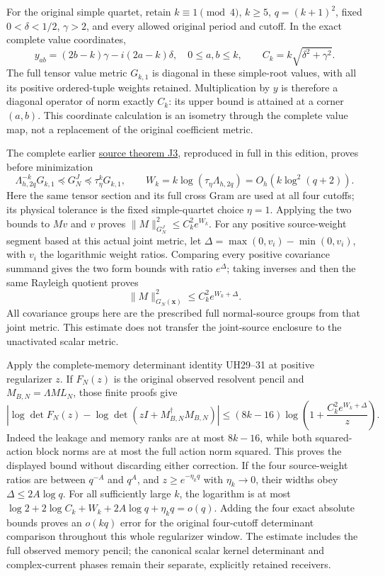 \documentclass[11pt]{article}
\begin{document}
For the original simple quartet, retain \(k\equiv1\pmod4\), \(k\ge5\), \(q=(k+1)^2\), fixed \(0<\delta<1/2\), \(\gamma>2\), and every allowed original period and cutoff. In the exact complete value coordinates, \[
y_{ab}=(2b-k)\gamma-i(2a-k)\delta,\quad 0\le a,b\le k,
\qquad C_k=k\sqrt{\delta^2+\gamma^2}.                     \tag{UFR21}
\] The full tensor value metric \(G_{k,1}\) is diagonal in these simple-root values, with all its positive ordered-tuple weights retained. Multiplication by \(y\) is therefore a diagonal operator of norm exactly \(C_k\): its upper bound is attained at a corner \((a,b)\). This coordinate calculation is an isometry through the complete value map, not a replacement of the original coefficient metric.

The complete earlier \href{https://github.com/KokunoYumeto/zeta-function-research-reader/blob/main/workbenches/splitzero-tandem/continuations/20260921-uniform-source-family/JOINT_MINIMUM_COMPLETE.tex\#L634}{source theorem J3}, reproduced in full in this edition, proves before minimization \[
\Lambda_{h,2q}^{-k}G_{k,1}\preceq G_N^J
\preceq\tau_\eta^kG_{k,1},\qquad
W_k=k\log(\tau_\eta\Lambda_{h,2q})=O_h(k\log^2(q+2)).
\] Here the same tensor section and its full cross Gram are used at all four cutoffs; its physical tolerance is the fixed simple-quartet choice \(\eta=1\). Applying the two bounds to \(Mv\) and \(v\) proves \(\|M\|_{G_N^J}^2\le C_k^2 e^{W_k}\). For any positive source-weight segment based at this actual joint metric, let \(\Delta=\max(0,v_i)-\min(0,v_i)\), with \(v_i\) the logarithmic weight ratios. Comparing every positive covariance summand gives the two form bounds with ratio \(e^\Delta\); taking inverses and then the same Rayleigh quotient proves \[
\|M\|_{G_N(\mathbf x)}^2\le C_k^2e^{W_k+\Delta}.
                                                               \tag{UFR22}
\] All covariance groups here are the prescribed full normal-source groups from that joint metric. This estimate does not transfer the joint-source enclosure to the unactivated scalar metric.

Apply the complete-memory determinant identity UH29--31 at positive regularizer \(z\). If \(F_N(z)\) is the original observed resolvent pencil and \(M_{B,N}=\Lambda ML_N\), those finite proofs give \[
\left|\log\det F_N(z)-\log\det(zI+M_{B,N}^{\dagger}M_{B,N})\right|
\le (8k-16)\log\left(1+\frac{C_k^2e^{W_k+\Delta}}{z}\right).
                                                               \tag{UFR23}
\] Indeed the leakage and memory ranks are at most \(8k-16\), while both squared-action block norms are at most the full action norm squared. This proves the displayed bound without discarding either correction. If the four source-weight ratios are between \(q^{-A}\) and \(q^A\), and \(z\ge e^{-\eta_k q}\) with \(\eta_k\to0\), their widths obey \(\Delta\le2A\log q\). For all sufficiently large \(k\), the logarithm is at most \(\log2+2\log C_k+W_k+2A\log q+\eta_k q=o(q)\). Adding the four exact absolute bounds proves an \(o(kq)\) error for the original four-cutoff determinant comparison throughout this whole regularizer window. The estimate includes the full observed memory pencil; the canonical scalar kernel determinant and complex-current phases remain their separate, explicitly retained receivers.
\end{document}
